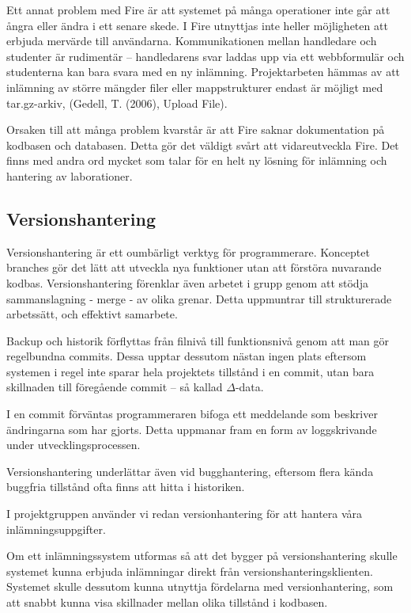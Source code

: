 Ett annat problem med Fire är att systemet på många operationer inte går att ångra eller ändra i ett senare skede. 
I Fire utnyttjas inte heller möjligheten att erbjuda mervärde till användarna. Kommunikationen mellan handledare och studenter är rudimentär – handledarens svar laddas upp via ett webbformulär och studenterna kan bara svara med en ny inlämning. Projektarbeten hämmas av att inlämning av större mängder filer eller mappstrukturer endast är möjligt med tar.gz-arkiv, (Gedell, T. (2006), Upload File).

Orsaken till att många problem kvarstår är att Fire saknar dokumentation på kodbasen och databasen. Detta gör det väldigt svårt att vidareutveckla Fire.
Det finns med andra ord mycket som talar för en helt ny lösning för inlämning och hantering av laborationer.

\subsection{Versionshantering}

Versionshantering är ett oumbärligt verktyg för programmerare. Konceptet branches gör det lätt att utveckla nya funktioner utan att förstöra nuvarande kodbas. Versionshantering förenklar även arbetet i grupp genom att  stödja sammanslagning - merge - av olika grenar. Detta uppmuntrar till strukturerade arbetssätt, och effektivt samarbete. 

Backup och historik förflyttas från filnivå till funktionsnivå genom att man gör regelbundna commits. Dessa upptar dessutom nästan ingen plats eftersom systemen i regel inte sparar hela projektets tillstånd i en commit, utan bara skillnaden till föregående commit – så kallad $\Delta$-data.

I en commit förväntas programmeraren bifoga ett meddelande som beskriver ändringarna som har gjorts. Detta uppmanar fram en form av loggskrivande under utvecklingsprocessen.

Versionshantering underlättar även vid bugghantering, eftersom flera kända buggfria tillstånd ofta finns att hitta i historiken.

I projektgruppen använder vi redan versionhantering för att hantera våra inlämningsuppgifter.

Om ett inlämningssystem utformas så att det bygger på versionshantering skulle systemet kunna erbjuda inlämningar direkt från versionshanteringsklienten. Systemet skulle dessutom kunna utnyttja fördelarna med versionhantering, som att snabbt kunna visa skillnader mellan olika tillstånd i kodbasen.

